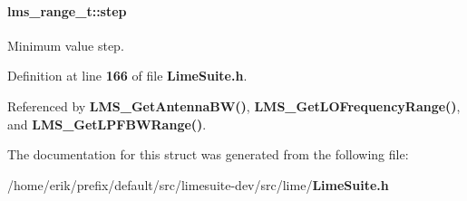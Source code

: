 \paragraph[{step}]{ lms\+\_\+range\+\_\+t\+::step}\label{structlms__range__t_a8ec6b2a96f23e96c6bd9211d366db0ba}


Minimum value step. 



Definition at line {\bf 166} of file {\bf Lime\+Suite.\+h}.



Referenced by {\bf L\+M\+S\+\_\+\+Get\+Antenna\+B\+W()}, {\bf L\+M\+S\+\_\+\+Get\+L\+O\+Frequency\+Range()}, and {\bf L\+M\+S\+\_\+\+Get\+L\+P\+F\+B\+W\+Range()}.



The documentation for this struct was generated from the following file\+:\begin{DoxyCompactItemize}
\item 
/home/erik/prefix/default/src/limesuite-\/dev/src/lime/{\bf Lime\+Suite.\+h}\end{DoxyCompactItemize}
